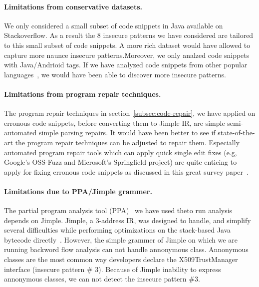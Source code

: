 \paragraph{Limitations from conservative datasets.} We only considered a small subset of code snippets in Java available on Stackoverflow. 
As a result the 8 insecure patterns we have considered are tailored to this small subset of code snippets. 
A more rich dataset would have allowed to capture more naunce insecure patterns.Moreover, we only analzed code snippets with Java/Andrioid tags.
If we have analyzed code snippets from other popular languages~\cite{stackoverflow-survey}, we would have been able to
discover more insecure patterns.   


\paragraph{Limitations from program repair techniques.} The program repair techniques in section~\ref{subsec:code-repair}, we have applied on erronous code snippets, 
before converting them to Jimple IR, are simple semi-automated simple parsing  repairs. It would have been better to see if state-of-the-art  
the program repair techniques can be adjusted to repair them. Especially automated program repair tools which can apply quick single edit fixes (e.g, Google's OSS-Fuzz and Microsoft's Springfield project) are quite enticing to apply for fixing erronous code snippets as discussed in this great survey paper~\cite{automated-program-repair}.



\noindent
\label{limitatons:jimple} 
\paragraph{Limitations due to PPA/Jimple grammer.} The partial program analysis tool (PPA)~\cite{dagenais2008enabling} we have used theto run 
analysis depends on Jimple.
Jimple, a 3-address IR, was designed to handle, and simplify several
difficulties while performing optimizations on the stack-based Java bytecode directly~\cite{vallee1998jimple}. However, 
the simple grammer of Jimple on which we are running backword flow analysis can not handle annonymous class. 
Annonymous classes are the most common way developers declare the X509TrustManager interface (insecure pattern \# 3). Because of
Jimple inability to express annonymous classes, we can not detect the insecure pattern \#3.


